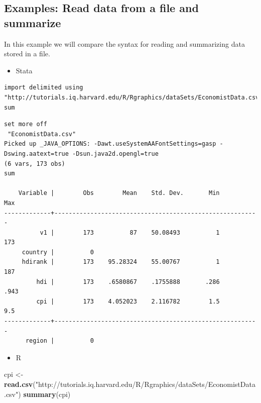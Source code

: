 \documentclass[]{book}
\newenvironment{Shaded}{\begin{snugshade}}{\end{snugshade}}
\newcommand{\KeywordTok}[1]{\textcolor[rgb]{0.13,0.29,0.53}{\textbf{#1}}}
\newcommand{\StringTok}[1]{\textcolor[rgb]{0.31,0.60,0.02}{#1}}
\newcommand{\NormalTok}[1]{#1}
\providecommand{\tightlist}{%
  \setlength{\itemsep}{0pt}\setlength{\parskip}{0pt}}
\begin{document}
\subsection{Examples: Read data from a file and
summarize}\label{examples-read-data-from-a-file-and-summarize}

In this example we will compare the syntax for reading and summarizing
data stored in a file.

\begin{itemize}
\tightlist
\item
  Stata
\end{itemize}

\begin{verbatim}
import delimited using "http://tutorials.iq.harvard.edu/R/Rgraphics/dataSets/EconomistData.csv"
sum
\end{verbatim}

\begin{verbatim}
set more off
 "EconomistData.csv"
Picked up _JAVA_OPTIONS: -Dawt.useSystemAAFontSettings=gasp -Dswing.aatext=true -Dsun.java2d.opengl=true
(6 vars, 173 obs)
sum

    Variable |        Obs        Mean    Std. Dev.       Min        Max
-------------+---------------------------------------------------------
          v1 |        173          87    50.08493          1        173
     country |          0
     hdirank |        173    95.28324    55.00767          1        187
         hdi |        173    .6580867    .1755888       .286       .943
         cpi |        173    4.052023    2.116782        1.5        9.5
-------------+---------------------------------------------------------
      region |          0
\end{verbatim}

\begin{itemize}
\tightlist
\item
  R
\end{itemize}

\begin{Shaded}
\begin{Highlighting}[]
\NormalTok{cpi <-}\StringTok{ }\KeywordTok{read.csv}\NormalTok{(}\StringTok{"http://tutorials.iq.harvard.edu/R/Rgraphics/dataSets/EconomistData.csv"}\NormalTok{)}
\KeywordTok{summary}\NormalTok{(cpi)}
\end{Highlighting}
\end{Shaded}
\end{document}
